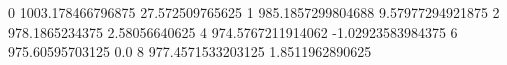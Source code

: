 0 1003.178466796875 27.572509765625
1 985.1857299804688 9.57977294921875
2 978.1865234375 2.58056640625
4 974.5767211914062 -1.02923583984375
6 975.60595703125 0.0
8 977.4571533203125 1.8511962890625
